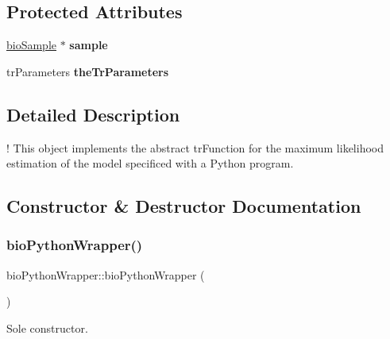 \subsection*{Protected Attributes}
\begin{DoxyCompactItemize}
\item 
\mbox{\label{classbio_python_wrapper_a3a71e8f565430c941d595effab9f8199}} 
\hyperlink{classbio_sample}{bio\+Sample} $\ast$ {\bfseries sample}
\item 
\mbox{\label{classbio_python_wrapper_ac23a8242b8126c70e29d3c213076e06e}} 
tr\+Parameters {\bfseries the\+Tr\+Parameters}
\end{DoxyCompactItemize}


\subsection{Detailed Description}
! This object implements the abstract tr\+Function for the maximum likelihood estimation of the model specificed with a Python program. 

\subsection{Constructor \& Destructor Documentation}
\mbox{\label{classbio_python_wrapper_a3309c7000124b3f5438321fd1090ae8e}} 
\subsubsection{\texorpdfstring{bio\+Python\+Wrapper()}{bioPythonWrapper()}}
{\footnotesize\ttfamily bio\+Python\+Wrapper\+::bio\+Python\+Wrapper (\begin{DoxyParamCaption}{ }\end{DoxyParamCaption})}

Sole constructor. \mbox{\label{classbio_python_wrapper_ace7c20e3240083deb78147e5f15a910e}} 
